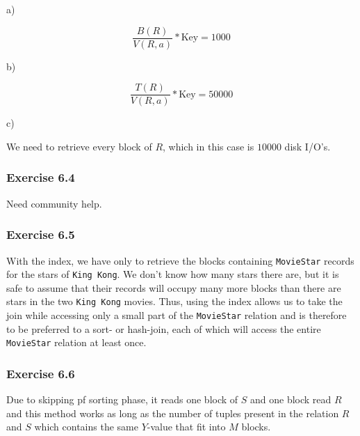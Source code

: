 \documentclass[../../main.tex]{subfiles}
\begin{document}
a)

$$
\frac{B(R)}{V(R, a)} * \text{Key} = 1000
$$

b)

$$
\frac{T(R)}{V(R, a)} * \text{Key} = 50000
$$

c)

We need to retrieve every block of $R$, which in this case is
$10000$ disk I/O's.

\subsubsection*{Exercise 6.4}

Need community help.

\subsubsection*{Exercise 6.5}

With the index, we have only to retrieve the blocks containing \verb|MovieStar|
records for the stars of \verb|King Kong|. We don't know how many stars there
are, but it is safe to assume that their records will occupy many more
blocks than there are stars in the two \verb|King Kong| movies.
Thus, using the index allows us to take the join while accessing only a
small part of the \verb|MovieStar| relation and is therefore to be preferred to a
sort- or hash-join, each of which will access the entire \verb|MovieStar| relation
at least once.

\subsubsection*{Exercise 6.6}

Due to skipping pf sorting phase, it reads one block of $S$ and one block
read $R$ and this method works as long as the number of tuples present in
the relation $R$ and $S$ which contains the same $Y$-value that fit into $M$
blocks.
\end{document}
